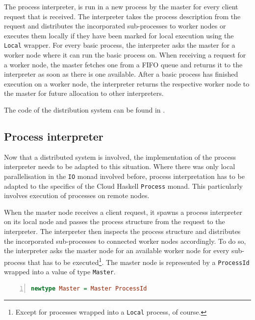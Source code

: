 The process interpreter, is run in a new process by the master for every client request that is received. The interpreter takes the process description from the request and distributes the incorporated sub-processes to worker nodes or executes them locally if they have been marked for local execution using the \texttt{Local} wrapper. For every basic process, the interpreter asks the master for a worker node where it can run the basic process on. When receiving a request for a worker node, the master fetches one from a FIFO queue and returns it to the interpreter as soon as there is one available. After a basic process has finished execution on a worker node, the interpreter returns the respective worker node to the master for future allocation to other interpreters.

The code of the distribution system can be found in .


\subsection{Process interpreter}
\label{chp:interpreter}
Now that a distributed system is involved, the implementation of the process interpreter needs to be adapted to this situation. Where there was only local parallelisation in the \texttt{IO} monad involved before, process interpretation has to be adapted to the specifics of the \textsf{Cloud Haskell} \texttt{Process} monad. This particularly involves execution of processes on remote nodes.

When the master node receives a client request, it spawns a process interpreter on its local node and passes the process structure from the request to the interpreter. The interpreter then inspects the process structure and distributes the incorporated sub-processes to connected worker nodes accordingly. To do so, the interpreter asks the master node for an available worker node for every sub-process that has to be executed\footnote{Except for processes wrapped into a \texttt{Local} process, of course.}. The master node is represented by a \texttt{ProcessId} wrapped into a value of type \texttt{Master}.
\begin{lstlisting}[language=Haskell,caption=Data type for the address of a master node.,numbers=left,frame=bt]
newtype Master = Master ProcessId
\end{lstlisting}

